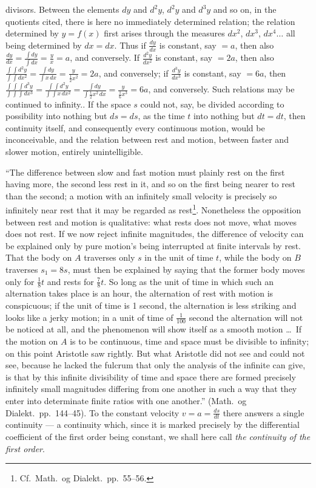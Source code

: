 \documentclass[12pt,a4paper]{book}
\begin{document}
{divisors. Between the elements $dy$ and $d^2y$, $d^2y$
and $d^3y$ and so on, in the quotients cited, there is here no
immediately determined relation; the relation determined by $y = f(x)$
first arises through the measures $dx^2$,
$dx^3$, $dx^4\ldots$ all being determined by $dx = dx$. Thus if
$\frac{dy}{dx}$ is constant, say $= a$, then also
$\frac{dy}{dx} = \frac{\int dy}{\int dx} = \frac{y}{x} = a$, and
conversely. If $\frac{d^2y}{dx^2}$ is constant, say $= 2a$, then
also $\frac{\int\int d^2y}{\int\int dx^2}
= \frac{\int dy}{\int x\,dx} = \frac{y}{\frac{1}{2}x^2} = 2a$,
and conversely; if $\frac{d^3y}{dx^3}$ is constant, say $= 6a$, then
$\frac{\int\int\int d^3y}{\int\int\int dx^3}
= \frac{\int\int d^2y}{\int\int x\,dx^2}
= \frac{\int dy}{\int \frac{1}{2}x^2\,dx}
= \frac{y}{\frac{1}{6}x^3} = 6a$, and conversely. Such relations
may be continued to infinity.}. If the
space $s$ could not, say, be divided according to possibility into nothing but
$ds = ds$, as the time $t$ into nothing but $dt = dt$, then
continuity itself, and consequently every continuous motion, would
be inconceivable, and the relation between rest and motion,
between faster and slower motion, entirely unintelligible.

``The difference between slow and fast motion must plainly rest on
the first having more, the second
\setcounter{footnote}{0}
less rest in it, and so on the first being nearer to rest
than the second; a motion with an infinitely small velocity
is precisely so infinitely near rest that it may be regarded
as rest\footnote{Cf.\ Math.\ og Dialekt.\ pp.~55--56.}. Nonetheless the
opposition between rest and motion is qualitative: what rests does not
move, what moves does not rest. If we now reject infinite magnitudes, the
difference of velocity can be explained only by pure motion's being interrupted
at finite intervals by rest. That the body on $A$ traverses only $s$ in the
unit of time $t$, while the body on $B$ traverses $s_1 = 8s$, must then be
explained by saying that the former body moves only for $\frac{1}{8}t$ and
rests for $\frac{7}{8}t$. So long as the unit of time in which such an
alternation takes place is an hour, the alternation of rest with motion is
conspicuous; if the unit of time is 1 second, the alternation is less striking
and looks like a jerky motion; in a unit of time of $\frac{1}{100}$ second the
alternation will not be noticed at all, and the phenomenon will show itself as
a smooth motion \ldots\ If the motion on $A$ is to be continuous, time and
space must be divisible to infinity; on this point Aristotle saw rightly. But
what Aristotle did not see and could not see, because he lacked the fulcrum
that only the analysis of the infinite can give, is that by this infinite
divisibility of time and space there are formed precisely infinitely small
magnitudes differing from one another in such a way that they enter into
determinate finite ratios with one another.'' (Math.\ og Dialekt.\
pp.~144--45). To the constant velocity $v = a = \frac{ds}{dt}$ there answers a
single continuity --- a continuity which, since it is marked precisely by the
differential coefficient of the first order being constant, we shall here call
\emph{the continuity of the first order}.
\end{document}
